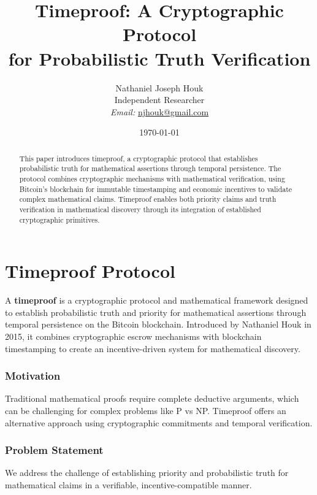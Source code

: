 \documentclass[12pt]{report}
\date{\today}
\begin{document}
\title{Timeproof: A Cryptographic Protocol \\ for Probabilistic Truth Verification}

\author{Nathaniel Joseph Houk\\
Independent Researcher\\
\textit{Email:} \href{mailto:njhouk@gmail.com}{njhouk@gmail.com}}

\maketitle

\begin{abstract}
This paper introduces timeproof, a cryptographic protocol that establishes probabilistic truth for mathematical assertions through temporal persistence. The protocol combines cryptographic mechanisms with mathematical verification, using Bitcoin's blockchain for immutable timestamping and economic incentives to validate complex mathematical claims. Timeproof enables both priority claims and truth verification in mathematical discovery through its integration of established cryptographic primitives.
\end{abstract}

\chapter{Timeproof Protocol}

A \textbf{timeproof} is a cryptographic protocol and mathematical framework designed to establish probabilistic truth and priority for mathematical assertions through temporal persistence on the Bitcoin blockchain. Introduced by Nathaniel Houk in 2015, it combines cryptographic escrow mechanisms with blockchain timestamping to create an incentive-driven system for mathematical discovery.

\subsection{Motivation}
Traditional mathematical proofs require complete deductive arguments, which can be challenging for complex problems like P vs NP. Timeproof offers an alternative approach using cryptographic commitments and temporal verification.

\subsection{Problem Statement}
We address the challenge of establishing priority and probabilistic truth for mathematical claims in a verifiable, incentive-compatible manner.
\end{document}
